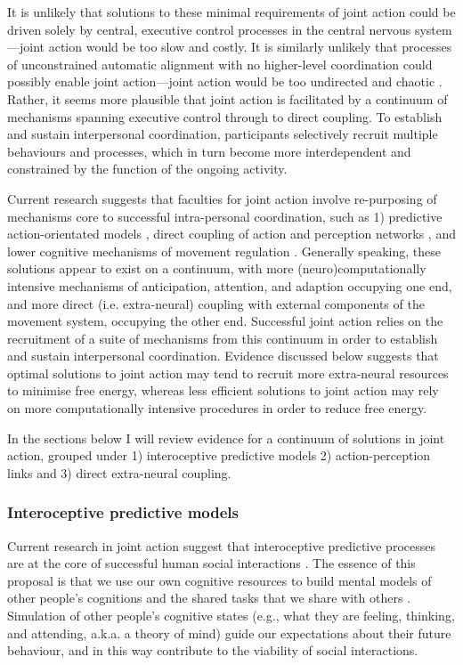\begin{CJK}{UTF8}{gbsn}
It is unlikely that solutions to these minimal requirements of joint action could be driven solely by central, executive control processes in the central nervous system---joint action would be too slow and costly. It is similarly unlikely that processes of unconstrained automatic alignment with no higher-level coordination could possibly enable joint action---joint action would be too undirected and chaotic \citep{Fusaroli2014}.  Rather, it seems more plausible that joint action is facilitated by a continuum of mechanisms spanning executive control through to direct coupling.  To establish and sustain interpersonal coordination, participants selectively recruit multiple behaviours and processes, which in turn become more interdependent and constrained by the function of the ongoing activity.

Current research suggests that faculties for joint action involve re-purposing of mechanisms core to successful intra-personal coordination, such as 1) predictive action-orientated models \citep{Vesper2012}, direct coupling of action and perception networks \citep{Novembre2014}, and lower cognitive mechanisms of movement regulation \citep{Semin2008,Riley2011}.  Generally speaking, these solutions appear to exist on a continuum, with more (neuro)computationally intensive mechanisms of anticipation, attention, and adaption occupying one end, and more direct (i.e. extra-neural) coupling with external components of the movement system, occupying the other end.  Successful joint action relies on the recruitment of a suite of mechanisms from this continuum in order to establish and sustain interpersonal coordination.  Evidence discussed below suggests that optimal solutions to joint action may tend to recruit more extra-neural resources to minimise free energy, whereas less efficient solutions to joint action may rely on more computationally intensive procedures in order to reduce free energy.

In the sections below I will review evidence for a continuum of solutions in joint action, grouped under 1) interoceptive predictive models 2) action-perception links and 3) direct extra-neural coupling.


\subsubsection{Interoceptive predictive models\label{sect:interoceptiveModelling}}
Current research in joint action suggest that interoceptive predictive processes are at the core of successful human social interactions \citep{Graziano2013,Manera2013,Sparenberg2012,Springer2012}.  The essence of this proposal is that we use our own cognitive resources to build mental models of other people’s cognitions and the shared tasks that we share with others \citep{Tomasello2005a}.  Simulation of other people’s cognitive states (e.g., what they are feeling, thinking, and attending, a.k.a. a theory of mind) guide our expectations about their future behaviour, and in this way contribute to the viability of social interactions.


\end{CJK}
